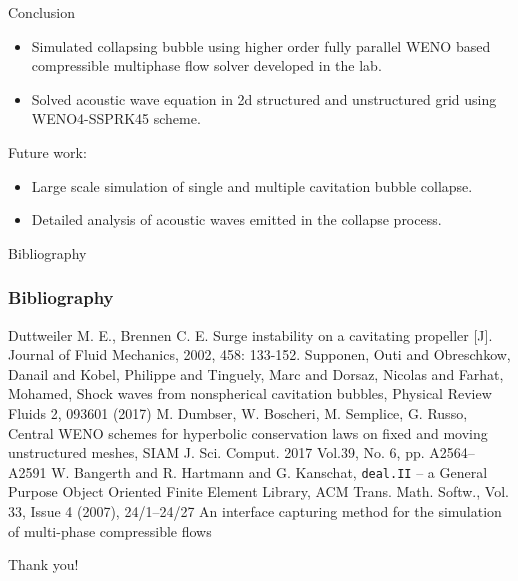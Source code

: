 \documentclass[10pt, aspectratio=169]{beamer}
\begin{document}
\begin{frame}{Conclusion}
	\begin{itemize}
		\item Simulated collapsing bubble using higher order fully parallel WENO based compressible multiphase flow solver developed in the lab.
		\item Solved acoustic wave equation in 2d structured and unstructured grid using WENO4-SSPRK45 scheme. 
	\end{itemize}
	Future work:
	\begin{itemize}
		\item Large scale simulation of single and multiple cavitation bubble collapse.
		\item Detailed analysis of acoustic waves emitted in the collapse process. 
	\end{itemize}
\end{frame}

\begin{frame}[allowframebreaks]{Bibliography}
	\frametitle{Bibliography}
	
	\begin{thebibliography}{99}
		 Duttweiler M. E., Brennen C. E. Surge instability on a cavitating propeller [J]. Journal of Fluid Mechanics, 2002, 458: 133-152.
		 Supponen, Outi and Obreschkow, Danail and Kobel, Philippe and Tinguely, Marc and Dorsaz, Nicolas and Farhat, Mohamed, Shock waves from nonspherical cavitation bubbles, Physical Review Fluids 2, 093601 (2017)
		M. Dumbser, W. Boscheri, M. Semplice, G. Russo, Central WENO schemes for hyperbolic conservation laws on fixed and moving unstructured meshes, SIAM J. Sci. Comput. 2017 Vol.39, No. 6, pp. A2564–A2591
		 W. Bangerth and R. Hartmann and G. Kanschat, \texttt{deal.II} -- a General Purpose Object Oriented Finite Element Library, ACM Trans. Math. Softw., Vol. 33, Issue 4 (2007), {24/1--24/27}
		 An interface capturing method for the simulation of multi-phase compressible flows
	\end{thebibliography}
\end{frame}
\begin{frame}[standout]
	Thank you!
\end{frame}
\end{document}
